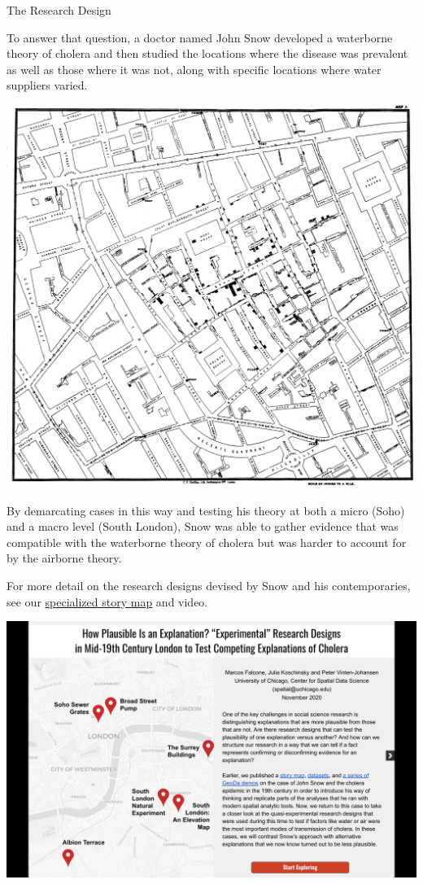 \documentclass[
]{book}
\begin{document}
The Research Design

To answer that question, a doctor named John Snow developed a waterborne theory of cholera and then studied the locations where the disease was prevalent as well as those where it was not, along with specific locations where water suppliers varied.

\includegraphics{images/snow3.jpg}

By demarcating cases in this way and testing his theory at both a micro (Soho) and a macro level (South London), Snow was able to gather evidence that was compatible with the waterborne theory of cholera but was harder to account for by the airborne theory.

For more detail on the research designs devised by Snow and his contemporaries, see our \href{https://docs.google.com/presentation/d/e/2PACX-1vTpkyf_CSeAgD8datvssFfNHHwypUEYIg-tAC-cNaj6Nu_wrqqIOdsT_Y4phZYl8EBJA_OyWvrFhJfV/pub?start=false\&loop=false\&delayms=3000\&slide=id.g9d798a6fd3_0_81}{specialized story map} and video.

\includegraphics{images/snow4.png}
\end{document}
